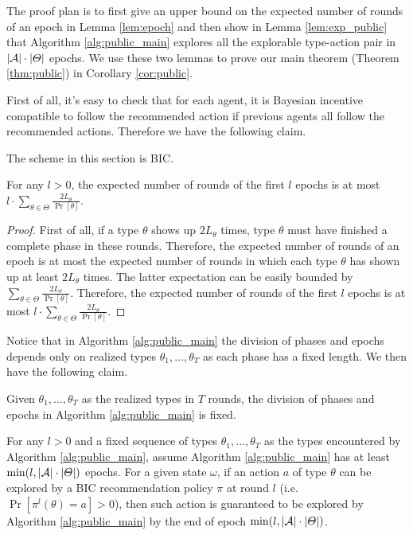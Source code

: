 The proof plan is to first give an upper bound on the expected number of rounds of an epoch in Lemma \ref{lem:epoch} and then show in Lemma \ref{lem:exp_public} that Algorithm \ref{alg:public_main} explores all the explorable type-action pair in $|\mathcal{A}| \cdot |\varTheta|$ epochs. We use these two lemmas to prove our main theorem (Theorem \ref{thm:public}) in Corollary \ref{cor:public}. 

First of all, it's easy to check that for each agent, it is Bayesian incentive compatible to follow the recommended action if previous agents all follow the recommended actions. Therefore we have the following claim. 
\begin{claim}
\label{clm:public_BIC}
The scheme in this section is BIC.
\end{claim}

\begin{lemma}
\label{lem:epoch}
For any $l>0$, the expected number of rounds of the first $l$ epochs is at most $l \cdot \sum_{\theta\in\varTheta} \frac{2L_{\theta}}{\Pr[\theta]}$. 
\end{lemma}

\begin{proof}
First of all, if a type $\theta$ shows up $2L_{\theta}$ times, type $\theta$ must have finished a complete phase in these rounds. Therefore, the expected number of rounds of an epoch is at most the expected number of rounds in which each type $\theta$ has shown up at least $2L_{\theta}$ times. The latter expectation can be easily bounded by $\sum_{\theta\in\varTheta} \frac{2L_{\theta}}{\Pr[\theta]}$. Therefore, the expected number of rounds of the first $l$ epochs is at most $l \cdot \sum_{\theta\in\varTheta} \frac{2L_{\theta}}{\Pr[\theta]}$. 
\end{proof}

Notice that in Algorithm \ref{alg:public_main} the division of phases and epochs depends only on realized types $\theta_1,...,\theta_T$ as each phase has a fixed length. We then have the following claim.   
\begin{claim}
Given $\theta_1,...,\theta_T$ as the realized types in $T$ rounds, the division of phases and epochs in Algorithm \ref{alg:public_main} is fixed. 
\end{claim}

\begin{lemma}
\label{lem:exp_public}
For any $l>0$ and a fixed sequence of types $\theta_1,...,\theta_T$ as the types encountered by Algorithm \ref{alg:public_main}, assume Algorithm \ref{alg:public_main} has at least $\min(l, |\mathcal{A}|\cdot |\varTheta|)$ epochs. 
For a given state $\omega$, if an action $a$ of type $\theta$ can be explored by a BIC recommendation policy $\pi$ at round $l$ (i.e. $ \Pr[\pi^l(\theta)= a]> 0$), then such action is guaranteed to be explored by Algorithm \ref{alg:public_main} by the end of epoch $\min(l, |\mathcal{A}|\cdot |\varTheta|)$. 
\end{lemma}

